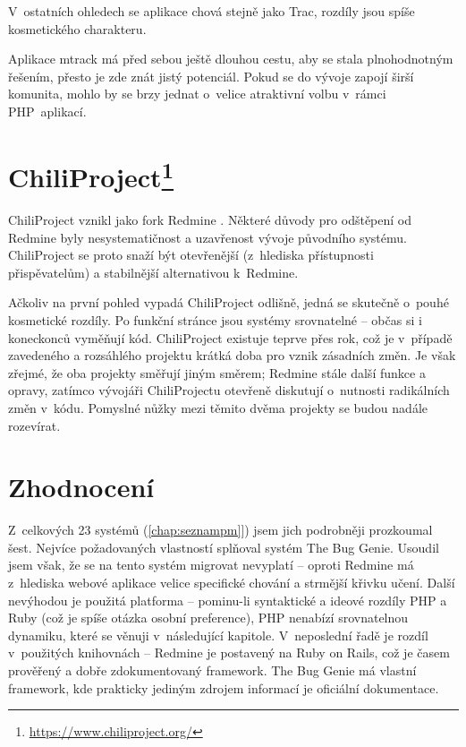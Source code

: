\documentclass[thesis=B,czech]{FITthesis}[2012/05/02]
\begin{document}
V~ostatních ohledech se aplikace chová stejně jako Trac, rozdíly jsou
spíše kosmetického charakteru.

Aplikace mtrack má před sebou ještě dlouhou cestu, aby se stala plnohodnotným
řešením, přesto je zde znát jistý potenciál. Pokud se do vývoje zapojí
širší komunita, mohlo by se brzy jednat o~velice atraktivní volbu
v~rámci PHP~aplikací.

\section[ChiliProject]{ChiliProject\footnote{\url{https://www.chiliproject.org/}}}

ChiliProject vznikl jako \gls{fork} Redmine
\citep{ChiliProjectWhyFork}. Některé důvody pro odštěpení od Redmine
byly nesystematičnost a uzavřenost vývoje původního systému.
ChiliProject se proto snaží
být otevřenější (z~hlediska přístupnosti přispěvatelům) a stabilnější
alternativou k~Redmine.

Ačkoliv na první pohled vypadá ChiliProject odlišně, jedná se skutečně
o~pouhé kosmetické rozdíly. Po funkční stránce jsou systémy srovnatelné -- občas
si i koneckonců vyměňují kód. ChiliProject existuje teprve přes
rok, což je v~případě zavedeného a rozsáhlého projektu krátká doba pro
vznik zásadních změn. Je však zřejmé, že oba projekty směřují jiným
směrem; Redmine stále  další funkce a opravy, zatímco
vývojáři ChiliProjectu otevřeně diskutují o~nutnosti radikálních změn
v~kódu. Pomyslné nůžky mezi těmito dvěma projekty se budou nadále
rozevírat.

\section{Zhodnocení}

Z~celkových 23 systémů (\autoref{chap:seznampm}]) jsem jich podrobněji
prozkoumal šest. Nejvíce požadovaných vlastností splňoval systém The Bug
Genie. Usoudil jsem však, že se na tento systém migrovat nevyplatí --
oproti Redmine má z~hlediska webové aplikace velice specifické chování a
strmější křivku učení. Další nevýhodou je použitá platforma -- pominu-li
syntaktické a ideové rozdíly PHP a Ruby (což je spíše otázka osobní
preference), PHP nenabízí srovnatelnou dynamiku, které se věnuji
v~následující kapitole. V~neposlední řadě je
rozdíl v~použitých knihovnách -- Redmine je postavený na Ruby on Rails,
což je časem prověřený a dobře zdokumentovaný framework. The Bug Genie
má vlastní framework, kde prakticky jediným zdrojem informací je
oficiální dokumentace.
\end{document}
